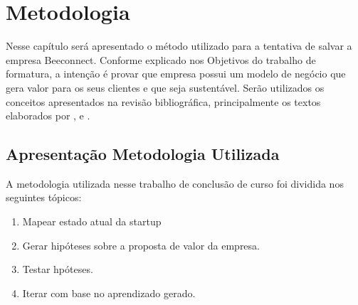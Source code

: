 \chapter[Metodologia]{Metodologia}
\label{chap:metodologia}
Nesse capítulo será apresentado o método utilizado para a tentativa de salvar a empresa Beeconnect. Conforme explicado nos Objetivos do trabalho de formatura, a intenção é provar que empresa possui um modelo de negócio que gera valor para os seus clientes e que seja sustentável. Serão utilizados os conceitos apresentados na revisão bibliográfica, principalmente os textos elaborados por ,  e .

\section{Apresentação Metodologia Utilizada}
\label{cha:apresentacao_metodologia}
A metodologia utilizada nesse trabalho de conclusão de curso foi dividida nos seguintes tópicos:
\begin{enumerate}
\item Mapear estado atual da startup
\item Gerar hipóteses sobre a proposta de valor da empresa.
\item Testar hpóteses.
\item Iterar com base no aprendizado gerado.
\end{enumerate}

